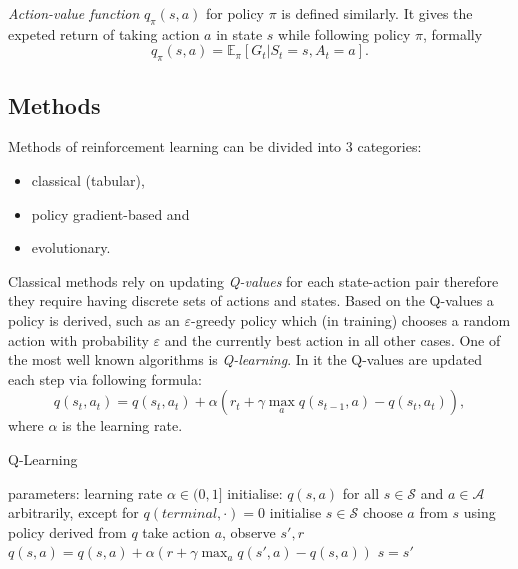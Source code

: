 \emph{Action-value function} $q_\pi(s,a)$ for policy $\pi$ is defined similarly. It gives the expeted return of taking action $a$ in state $s$ while following policy $\pi$, formally
\begin{equation}
    q_\pi(s,a) = \mathbb{E}_\pi[G_t|S_t=s, A_t=a].
\end{equation}\cite{Sutton1998}
\subsection{Methods}
Methods of reinforcement learning can be divided into 3 categories\cite{Sehnke2012}: \begin{itemize}
    \item classical (tabular),
    \item policy gradient-based and
    \item evolutionary.
\end{itemize}

Classical methods rely on updating \emph{Q-values} for each state-action pair therefore they require having discrete sets of actions and states. Based on the Q-values a policy is derived, such as an $\varepsilon$-greedy policy which (in training) chooses a random action with probability $\varepsilon$ and the currently best action in all other cases. One of the most well known algorithms is \emph{Q-learning}. In it the Q-values are updated each step via following formula:
\begin{equation}
    q(s_t,a_t) = q(s_t,a_t) + \alpha \left( r_t+\gamma \max_a q(s_{t-1},a)-q(s_t,a_t)\right), 
\end{equation}
where $\alpha$ is the learning rate.

\begin{algorithm}[h]
    \begin{algorithmic}[1]
    \caption{Q-Learning}
    \label{alg:q-learning}
        \State parameters: learning rate $\alpha \in (0,1]$ 
        \State initialise: $q(s,a)$ for all $s\in\mathcal{S}$ and $a\in \mathcal{A}$ arbitrarily, except for $q(terminal, \cdot) = 0$ 
            \State initialise $s\in\mathcal{S}$
            \Repeat
                \State choose $a$ from $s$ using policy derived from $q$
                \State take action $a$, observe $s', r$
                \State $q(s,a) = q(s,a) + \alpha \left( r+\gamma \max_a q(s',a)-q(s,a)\right)$
                \State $s = s'$
        \EndFor
    \end{algorithmic}
\end{algorithm}

